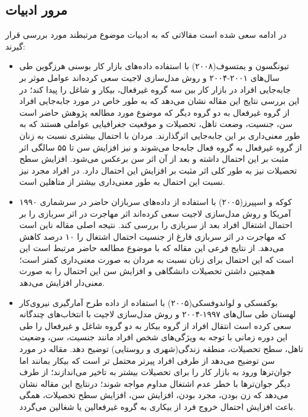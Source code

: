 \documentclass[12pt, a4paper]{article}
\begin{document}
	\subsection{مرور ادبیات}
در ادامه سعی شده است مقالاتی که به ادبیات موضوع مرتبطند مورد بررسی قرار گیرند:
\begin{itemize}
\item
تیونگسون و یمتسوف(۲۰۰۸)
با استفاده داده‌های بازار کار بوسنی هرزگوین طی سال‌های ۲۰۰۱-۲۰۰۴ و روش مدل‌سازی لاجیت
سعی کرده‌اند عوامل موثر بر جابه‌جایی افراد در بازار کار  بین سه  گروه غیرفعال، بیکار و شاغل را پیدا کند؛ در این بررسی نتایج این مقاله نشان می‌دهد که به طور خاص در مورد جابه‌جایی افراد از گروه غیرفعال به دو گروه دیگر که موضوع مورد مطالعه پژوهش حاضر است سن، جنسیت، وضعت تاهل، تحصیلات و موقعیت جغرافیایی عواملی هستند که به طور معنی‌داری بر این جابه‌جایی اثرگذارند. مردان با احتمال بیشتری نسبت به زنان از گروه غیرفعال به گروه فعال جابه‌جا می‌شوند و نیز افزایش سن تا ۵۵ سالگی اثر مثبت بر این احتمال داشته و بعد از آن اثر سن برعکس می‌شود. افزایش سطح تحصیلات نیز به طور کلی اثر مثبت بر افزایش این احتمال دارد. در افراد مجرد نیز نسبت این احتمال به طور معنی‌داری بیشتر از متاهلین است.
\item
کوکه و اسپیرز(۲۰۰۵)
 با استفاده از داده‌های سربازان حاضر در سرشماری ۱۹۹۰ آمریکا و روش مدل‌سازی لاجیت سعی کرده‌اند اثر مهاجرت در اثر سربازی را بر احتمال اشتغال افراد بعد از سربازی را بررسی کند. نتیجه اصلی مقاله ناین است که مهاجرت در اثر سربازی  فارغ از جنسیت احتمال اشتغال را ۱۰ درصد کاهش می‌دهد. از نتایج فرعی این مقاله که با موضوع مطالعه حاضر مرتبط است این است که این احتمال برای زنان نسبت به مردان به صورت معنی‌داری کمتر است؛ همچنین داشتن تحصیلات دانشگاهی و افزایش سن این احتمال را به صورت معنی‌دار افزایش می‌دهد.
 \item
 بوکفسکی و لواندوفسکی(۲۰۰۵) 
 با استفاده از داده طرح آمارگیری نیروی‌کار لهستان طی سال‌های ۱۹۹۷-۲۰۰۴ و روش مدل‌سازی لاجیت با انتخاب‌های چندگانه سعی کرده است انتقال افراد از گروه بیکار به دو گروه شاغل و غیرفعال را طی این دوره زمانی با توجه به ویژگی‌های شخص افراد مانند جنسیت، سن، وضعیت تاهل، سطح تحصیلات، منطقه زندگی(شهری و روستایی) توضیح دهد. مقاله  در مورد سن توضیح می‌دهد  از طرفی افراد پیرتر محتمل ‌تر است که بیکار بمانند اما  جوان‌ترها  ورود به بازار کار را برای تحصیلات بیشتر به تاخیر می‌اندازند؛ از طرف دیگر جوان‌ترها با خطر عدم اشتغال مداوم مواجه شوند؛ درنتایج این مقاله نشان می‌دهد که زن بودن، مجرد بودن، افزایش سن، افزایش سطح تحصیلات، همگی باعث افزایش احتمال خروج فرد از بیکاری به گروه غیرفعالین یا شغالین می‌گردد.

\end{itemize}
\end{document}
